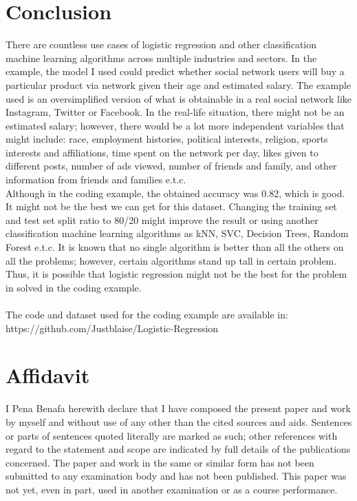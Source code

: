 \documentclass[conference]{IEEEtran}
\begin{document}
\section{Conclusion}
There are countless use cases of logistic regression and other classification machine learning algorithms across multiple industries and sectors. In the example, the model I used could predict whether social network users will buy a particular product via network given their age and estimated salary. The example used is an oversimplified version of what is obtainable in a real social network like Instagram, Twitter or Facebook. In the real-life situation, there might not be an estimated salary; however, there would be a lot more independent variables that might include: race, employment histories, political interests, religion, sports interests and affiliations, time spent on the network per day, likes given to different posts, number of ads viewed, number of friends and family, and other information from friends and families e.t.c.\\
Although in the coding example, the obtained accuracy was 0.82, which is good. It might not be the best we can get for this dataset. Changing the training set and test set split ratio to 80/20 might improve the result or using another classification machine learning algorithms as kNN, SVC, Decision Trees, Random Forest e.t.c. It is known that no single algorithm is better than all the others on all the problems; however, certain algorithms stand up tall in certain problem\cite{bb6}. Thus, it is possible that logistic regression might not be the best for the problem in solved in the coding example.\\
\\
The code and dataset used for the coding example are available in:
https://github.com/Justblaise/Logistic-Regression



\section*{Affidavit}
I Pena Benafa herewith declare that I have composed the present paper and work by myself and without use of any other than the cited sources and aids. Sentences or parts of sentences quoted literally are marked as such; other references with regard to the statement and scope are indicated by full details of the publications concerned. The paper and work in the same or similar form has not been submitted to any examination body and has not been published. This paper was not yet, even in part, used in another examination or as a course performance.












\end{document}
